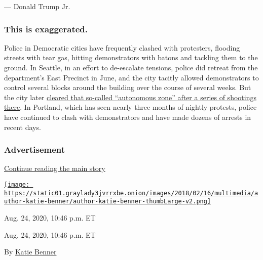 --- Donald Trump Jr.

\hypertarget{this-is-exaggerated-}{%
\subsubsection{\texorpdfstring{\textbf{This is exaggerated.}
}{This is exaggerated. }}\label{this-is-exaggerated-}}

Police in Democratic cities have frequently clashed with protesters,
flooding streets with tear gas, hitting demonstrators with batons and
tackling them to the ground. In Seattle, in an effort to de-escalate
tensions, police did retreat from the department's East Precinct in
June, and the city tacitly allowed demonstrators to control several
blocks around the building over the course of several weeks. But the
city later
\href{https://slack-redir.net/link?url=https\%3A\%2F\%2Fwww.nytimes3xbfgragh.onion\%2F2020\%2F07\%2F01\%2Fus\%2Fseattle-protest-zone-CHOP-CHAZ-unrest.html}{cleared
that so-called ``autonomous zone'' after a series of shootings there}.
In Portland, which has seen nearly three months of nightly protests,
police have continued to clash with demonstrators and have made dozens
of arrests in recent days.

\hypertarget{advertisement-1}{%
\subsubsection{Advertisement}\label{advertisement-1}}

\protect\hyperlink{after-dfp-ad-mid2}{Continue reading the main story}

\href{https://www.nytimes3xbfgragh.onion/by/katie-benner}{\texttt{[image: https://static01.graylady3jvrrxbe.onion/images/2018/02/16/multimedia/author-katie-benner/author-katie-benner-thumbLarge-v2.png]}}

Aug. 24, 2020, 10:46 p.m. ET

Aug. 24, 2020, 10:46 p.m. ET

By \href{https://www.nytimes3xbfgragh.onion/by/katie-benner}{Katie
Benner}


